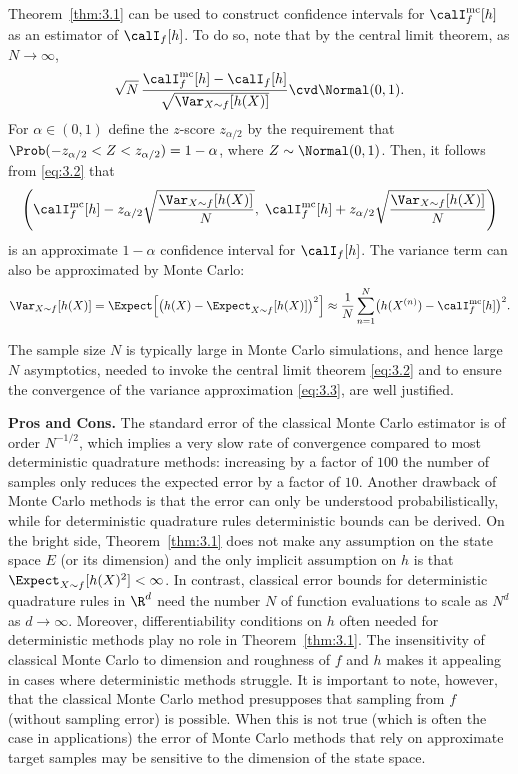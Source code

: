 Theorem~\ref{thm:3.1} can be used to construct confidence intervals for
$\calI_f^{\mathrm{mc}}[h]$ as an estimator of $\calI_f[h]$. To do so, note
that by the central limit theorem, as $N \to \infty$,
\begin{equation}
\label{eq:3.2}
  \sqrt{N}\,\frac{\calI_f^{\mathrm{mc}}[h] - \calI_f[h]}%
               {\sqrt{\Var_{X \sim f}[h(X)]}}
  \cvd \Normal(0,1).
\end{equation}
For $\alpha \in (0,1)$ define the $z$-score $z_{\alpha/2}$ by the requirement
that $\Prob(-z_{\alpha/2} < Z < z_{\alpha/2}) = 1 - \alpha$, where
$Z \sim \Normal(0,1)$. Then, it follows from \eqref{eq:3.2} that
\[
  \left(
    \calI_f^{\mathrm{mc}}[h] - z_{\alpha/2}\sqrt{\frac{\Var_{X \sim f}[h(X)]}{N}},\;
    \calI_f^{\mathrm{mc}}[h] + z_{\alpha/2}\sqrt{\frac{\Var_{X \sim f}[h(X)]}{N}}
  \right)
\]
is an approximate $1-\alpha$ confidence interval for $\calI_f[h]$. The variance
term can also be approximated by Monte Carlo:
\begin{equation}
\label{eq:3.3}
  \Var_{X \sim f}\!\left[h(X)\right]
  = \Expect\!\left[\bigl(h(X) - \Expect_{X \sim f}[h(X)]\bigr)^2\right]
  \approx
  \frac{1}{N}\sum_{n=1}^{N}
    \bigl(h(X^{(n)}) - \calI_f^{\mathrm{mc}}[h]\bigr)^2.
\end{equation}

The sample size $N$ is typically large in Monte Carlo simulations, and hence
large $N$ asymptotics, needed to invoke the central limit theorem \eqref{eq:3.2}
and to ensure the convergence of the variance approximation \eqref{eq:3.3}, are
well justified.

\medskip
\noindent\textbf{Pros and Cons.}
The standard error of the classical Monte Carlo estimator is of order
$N^{-1/2}$, which implies a very slow rate of convergence compared to most
deterministic quadrature methods: increasing by a factor of $100$ the number of
samples only reduces the expected error by a factor of $10$. Another drawback of
Monte Carlo methods is that the error can only be understood probabilistically,
while for deterministic quadrature rules deterministic bounds can be derived.
On the bright side, Theorem~\ref{thm:3.1} does not make any assumption on the
state space $E$ (or its dimension) and the only implicit assumption on $h$ is
that $\Expect_{X \sim f}[h(X)^2] < \infty$. In contrast, classical error
bounds for deterministic quadrature rules in $\R^d$ need the number $N$ of
function evaluations to scale as $N^d$ as $d \to \infty$. Moreover,
differentiability conditions on $h$ often needed for deterministic methods play
no role in Theorem~\ref{thm:3.1}. The insensitivity of classical Monte Carlo to
dimension and roughness of $f$ and $h$ makes it appealing in cases where
deterministic methods struggle. It is important to note, however, that the
classical Monte Carlo method presupposes that sampling from $f$ (without
sampling error) is possible. When this is not true (which is often the case in
applications) the error of Monte Carlo methods that rely on approximate target
samples may be sensitive to the dimension of the state space.
